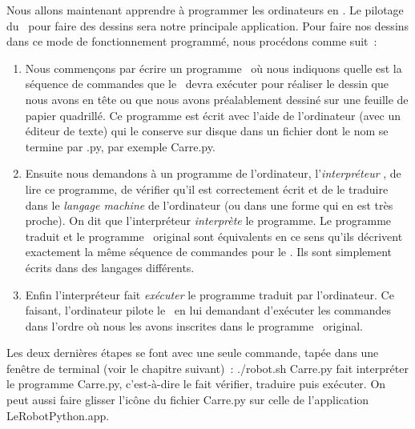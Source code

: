 Nous allons maintenant apprendre à programmer les ordinateurs
en \python. Le pilotage du \robot\ pour faire des dessins sera notre 
principale application. Pour faire nos dessins dans
ce mode de fonctionnement programmé, nous procédons comme suit~:
\begin{enumerate}
\item Nous commençons par écrire un programme \python\ où nous 
in\-di\-quons quelle est la séquence de commandes que le \robot\ devra 
exécuter pour réaliser le dessin que nous avons en tête ou que
nous avons pré\-a\-la\-ble\-ment dessiné sur une feuille de papier
quadrillé. Ce programme est écrit avec l'aide de l'ordinateur
(avec un éditeur de texte) qui le conserve sur disque dans un fichier dont le nom se termine 
par {\idt .py}, par exemple {\idt Carre.py}.
\item  Ensuite nous demandons à un programme de l'ordinateur, l'{\em in\-ter\-pré\-teur} 
\python, de lire ce programme, de vérifier qu'il est correctement écrit et de 
le traduire dans le {\em langage machine} de l'ordinateur 
(ou dans une forme qui en est très proche). On dit que l'interpréteur 
{\em interprète} le programme. Le programme traduit et le programme
\python\ ori\-gi\-nal sont équivalents en ce sens qu'ils décrivent 
exactement la même séquence de commandes pour le \robot. Ils sont
simplement écrits dans des langages différents.
\item  Enfin l'interpréteur fait {\em exécuter} le 
programme traduit par l'ordinateur. Ce faisant, l'ordinateur pilote le \robot\ en lui
demandant d'exé\-cu\-ter les commandes dans l'ordre où nous les avons 
inscrites dans le programme \python\ ori\-gi\-nal. 
\end{enumerate}
Les deux dernières étapes se font avec une seule commande, tapée dans
une fenêtre de terminal (voir le chapitre suivant)~:
{\idt ./robot.sh Carre.py} fait interpréter le programme {\idt Carre.py}, 
c'est-à-dire le fait vérifier, traduire puis exécuter. On peut aussi faire glisser 
l'icône du fichier {\idt Carre.py} sur celle de l'application {\idt LeRobotPython.app}.

